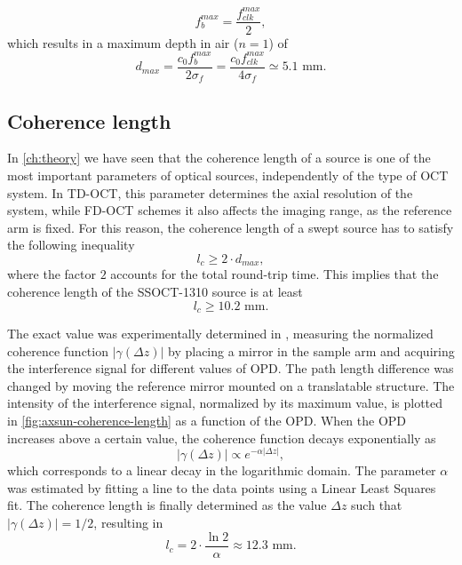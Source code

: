 	\begin{equation}
		f_b^{max} = \frac{f_{clk}^{max}}{2},
	\end{equation}
which results in a maximum depth in air ($n=1$) of  
	\begin{equation}
		d_{max} = \frac{c_0 f_{b}^{max}}{2\sigma_f}  =  \frac{c_0 f_{clk}^{max}}{4\sigma_f} \simeq 5.1 \text{ mm}.
	\end{equation}

\subsection{Coherence length}
In \autoref{ch:theory} we have seen that the coherence length of a source is one of the most important parameters of optical sources, independently of the type of OCT system. In \ac{TD-OCT}, this parameter determines the axial resolution of the system, while \ac{FD-OCT} schemes it also affects the imaging range, as the reference arm is fixed. For this reason, the coherence length of a swept source has to satisfy the following inequality
\begin{equation}
	l_c \geq 2\cdot d_{max},
\end{equation}
where the factor $2$ accounts for the total round-trip time. This implies that the coherence length of the SSOCT-1310 source is at least
\begin{equation}
	l_c \geq  10.2 \text{ mm.}
\end{equation}

The exact value was experimentally determined in \cite{Calabrese2017}, measuring the normalized coherence function $|\gamma(\Delta z)|$ by placing a mirror in the sample arm and acquiring the interference signal for different values of \ac{OPD}. The path length difference was changed by moving the reference mirror mounted on a translatable structure. The intensity of the interference signal, normalized by its maximum value, is plotted in  \autoref{fig:axsun-coherence-length} as a function of the \ac{OPD}. When the \ac{OPD} increases above a certain value, the coherence function decays exponentially as
\begin{equation}
|\gamma(\Delta z)| \propto e^{-\alpha |\Delta z|},
\end{equation}
which corresponds to a linear decay in the logarithmic domain. The parameter $\alpha$ was estimated by fitting a line to the data points using a Linear Least Squares fit. The coherence length is finally determined as the value $\Delta z$ such that $|\gamma(\Delta z)| = 1/2$, resulting in
\begin{equation}
	l_c = 2 \cdot \frac{\ln 2}{\alpha} \approx 12.3 \text{ mm.}
\end{equation}


